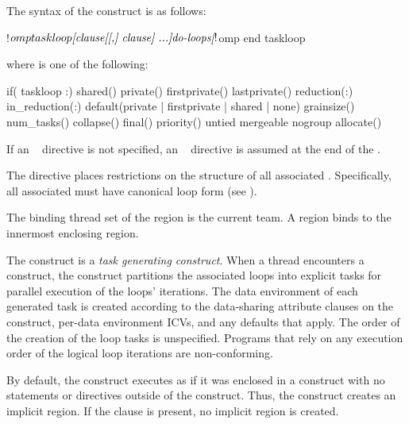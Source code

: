 \begin{fortranspecific}
The syntax of the  construct is as follows:
\begin{ompfPragma}
!$omp taskloop \plc{[clause[[,] clause] ...]}
    \plc{do-loops}
\plc{[}!$omp end taskloop\plc{]}
\end{ompfPragma}
where  is one of the following:
\begin{indentedcodelist}
if(\plc{[} taskloop :\plc{] scalar-logical-expr})
shared()
private()
firstprivate()
lastprivate()
reduction(:)
in_reduction(:)
default(private \textnormal{|} firstprivate \textnormal{|} shared \textnormal{|} none)
grainsize()
num_tasks()
collapse()
final()
priority()
untied
mergeable
nogroup
allocate(\plc{[allocator: ]})
\end{indentedcodelist}

If an ~ directive is not specified, an
~ directive is assumed at the end of the
.

The  directive places restrictions on the structure of all
associated . Specifically, all associated  must
have canonical loop form (see ).
\end{fortranspecific}

\binding
The binding thread set of the  region is the current team. A  region binds to the innermost enclosing  region.

\descr
The  construct is a \emph{task generating construct}. When a thread encounters a  construct, the construct partitions the associated loops into explicit tasks for parallel execution of the loops' iterations. The data environment of each generated task is created according to the data-sharing attribute clauses on the  construct, per-data environment ICVs, and any defaults that apply. The order of the creation of the loop tasks is unspecified.
Programs that rely on any execution order of the logical loop iterations are non-conforming.

By default, the  construct executes as if it was enclosed in a  construct with no statements or directives outside of the  construct. Thus, the  construct creates an implicit  region. If the  clause is present, no implicit  region is created.

